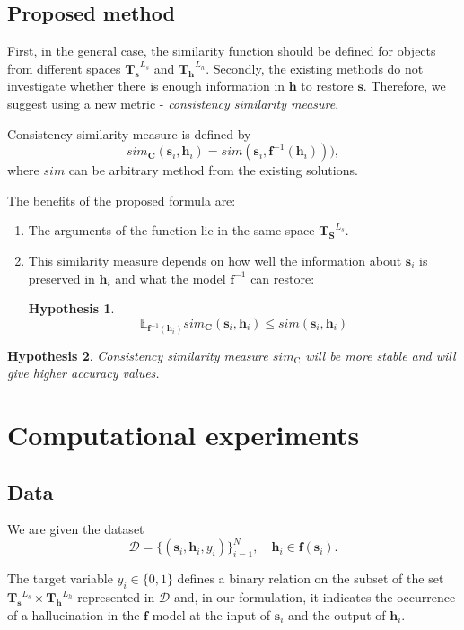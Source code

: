 \documentclass[11pt]{article}
\newtheorem{hyp}{Hypothesis}
\begin{document}
\subsection{Proposed method}

First, in the general case, the similarity function should be defined for objects from different spaces $\mathbf{T_s}^{L_s}$ and $\mathbf{T_h}^{L_h}$. Secondly, the existing methods do not investigate whether there is enough information in $\mathbf{h}$ to restore $\mathbf{s}$. Therefore, we suggest using a new metric - \textit{consistency similarity measure}.

Consistency similarity measure is defined by
\[{sim}_{\mathbf{C}} (\mathbf{s}_i, \mathbf{h}_i) = {sim}(\mathbf{s}_i, \mathbf{f}^{-1}(\mathbf{h}_i))),\]
where ${sim}$ can be arbitrary method from the existing solutions.

The benefits of the proposed formula are:

\begin{enumerate}
    \item The arguments of the function lie in the same space $\mathbf{T_S}^{L_s}$.
    \item This similarity measure depends on how well the information about $\mathbf{s}_i$ is preserved in $\mathbf{h}_i$ and what the model $\mathbf{f}^{-1}$ can restore:
    \begin{hyp}
    \[\mathbb{E}_{\mathbf{f}^{-1}(\mathbf{h}_i)} {sim}_{\mathbf{C}} (\mathbf{s}_i, \mathbf{h}_i) \le{sim} (\mathbf{s}_i, \mathbf{h}_i) \]
    \end{hyp}
\end{enumerate}

\begin{hyp}
Consistency similarity measure $sim_\text{C}$ will be more stable and will give higher accuracy values.
\end{hyp}

\section{Computational experiments}

\subsection{Data}

We are given the dataset
\[\mathcal{D} = \{(\mathbf{s}_i, \mathbf{h}_i, y_i) \}_{i=1}^N, \quad \mathbf{h}_i \in \mathbf{f}(\mathbf{s}_i).\]

The target variable $y_i \in \{0, 1\}$ defines a binary relation on the subset of the set $\mathbf{T_s}^{L_s} \times \mathbf{T_h}^{L_h}$ represented in $\mathcal{D}$ and, in our formulation, it indicates the occurrence of a hallucination in the $\mathbf{f}$ model at the input of $\mathbf{s}_i$ and the output of $\mathbf{h}_i$.
\end{document}
